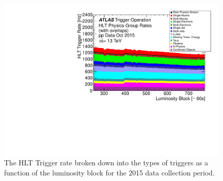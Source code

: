 \begin{figure}[hbtp]
\includegraphics[width=\fullfig]{figures/trigger_hltrate.pdf}
\caption{The \acs*{HLT} Trigger rate broken down into the types of triggers as a function of the luminosity block for the 2015 data collection period.}
\label{fig:trigger_hltrate}
\end{figure}

